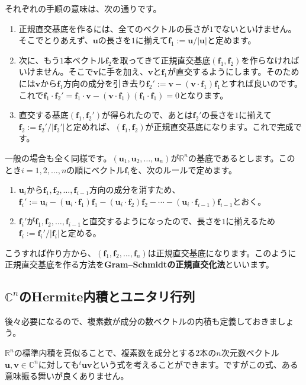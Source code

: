 それぞれの手順の意味は、次の通りです。
\begin{enumerate}
\item[\CID{7555}] 正規直交基底を作るには、全てのベクトルの長さが$1$でないといけません。そこでとりあえず、$\bm{u}$の長さを$1$に揃えて$\bm{f}_1 := \bm{u}/|\bm{u}|$と定めます。
\item[\CID{7556}] 次に、もう$1$本ベクトル$\bm{f}_2$を取ってきて正規直交基底$(\bm{f}_1, \bm{f}_2)$を作らなければいけません。そこで$\bm{v}$に手を加え、$\bm{v}$と$\bm{f}_1$が直交するようにします。そのためには$\bm{v}$から$\bm{f}_1$方向の成分を引き去り$\bm{f}_2' := \bm{v} - (\bm{v} \cdot \bm{f}_1) \bm{f}_1$とすれば良いのです。これで$\bm{f}_1 \cdot \bm{f}_2' = \bm{f}_1 \cdot \bm{v} - (\bm{v} \cdot \bm{f}_1)(\bm{f}_1 \cdot \bm{f}_1) = 0$となります。
\item[\CID{7557}] 直交する基底$(\bm{f}_1, \bm{f}_2')$が得られたので、あとは$\bm{f}_2'$の長さを$1$に揃えて$\bm{f}_2 := \bm{f}_2' / |\bm{f}_2'|$と定めれば、$(\bm{f}_1, \bm{f}_2)$が正規直交基底になります。これで完成です。
\end{enumerate}

一般の場合も全く同様です。$(\bm{u}_1, \bm{u}_2, \ldots, \bm{u}_n)$が$\mathbb{R}^n$の基底であるとします。このとき$i = 1, 2, \ldots, n$の順にベクトル$\bm{f}_i$を、次のルールで定めます。
\begin{enumerate}
\item $\bm{u}_i$から$\bm{f}_1, \bm{f}_2, \ldots, \bm{f}_{i - 1}$方向の成分を消すため、$\bm{f}_i' := \bm{u}_i - (\bm{u}_i \cdot \bm{f}_1) \bm{f}_1 - (\bm{u}_i \cdot \bm{f}_2) \bm{f}_2 - \cdots - (\bm{u}_i \cdot \bm{f}_{i - 1}) \bm{f}_{i - 1}$とおく。
\item $\bm{f}_i'$が$\bm{f}_1, \bm{f}_2, \ldots, \bm{f}_{i - 1}$と直交するようになったので、長さを$1$に揃えるため$\bm{f}_i := \bm{f}_i' / |\bm{f}_i|$と定める。
\end{enumerate}
こうすれば作り方から、$(\bm{f}_1, \bm{f}_2, \ldots, \bm{f}_n)$は正規直交基底になります。このように正規直交基底を作る方法を\textbf{Gram--Schmidtの正規直交化法}といいます。

\subsection{$\mathbb{C}^n$のHermite内積とユニタリ行列}

後々必要になるので、複素数が成分の数ベクトルの内積も定義しておきましょう。

$\mathbb{R}^n$の標準内積を真似ることで、複素数を成分とする$2$本の$n$次元数ベクトル$\bm{u}, \bm{v} \in \mathbb{C}^n$に対しても${}^t\bm{u} \bm{v}$という式を考えることができます。ですがこの式、ある意味振る舞いが良くありません。

